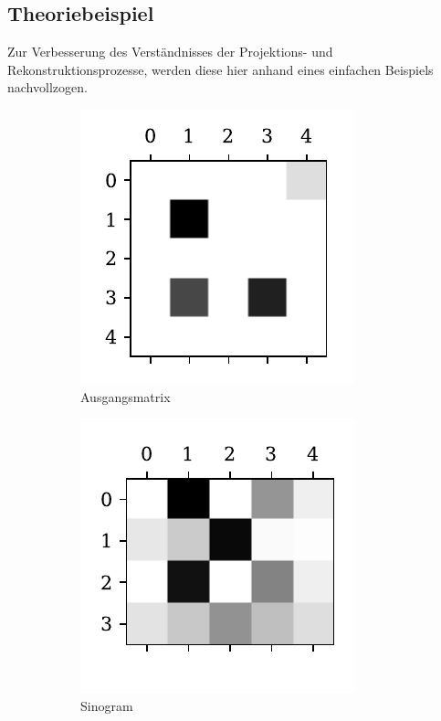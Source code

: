 \documentclass[slug=PET, room=Andreas-Schubert-Bau\,\ 424A, supervisor=Carsten\ Bittrich, coursedate=10.\ 01.\ 2020]{../../Lab_Report_LaTeX/lab_report}
\begin{document}
\subsection{Theoriebeispiel}
\label{sec:theobei}
Zur Verbesserung des Verst\"andnisses der Projektions- und
Rekonstruktionsprozesse, werden diese hier anhand eines einfachen
Beispiels nachvollzogen.

\begin{figure}[htp]
  \centering
  \begin{subfigure}[t]{.25\textwidth}
    \centering
    \includegraphics[width=.6\textwidth]{../auswertung/figs/theory/source.pdf}
    \caption{Ausgangsmatrix}
    \label{fig:theory-source}
  \end{subfigure}
  \begin{subfigure}[t]{.25\textwidth}
    \centering
    \includegraphics[width=.6\textwidth]{../auswertung/figs/theory/projection.pdf}
    \caption{Sinogram}
    \label{fig:theory-projection}
  \end{subfigure}
  \begin{subfigure}[t]{.25\textwidth}

\end{subfigure}
\end{figure}
\end{document}
